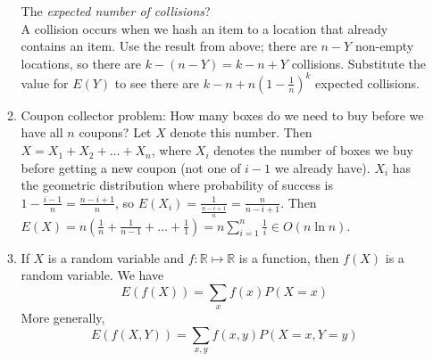 \documentclass[10pt]{article}
\begin{document}
\begin{multicols}{2}
\begin{enumerate}
\begin{enumerate}
            
            The \textit{expected number of collisions}?\\ 
            A collision occurs when we hash an item to a location that already contains an item. Use the result from above; there are $n - Y$ non-empty locations, so there are $k - (n - Y) = k-n+Y$ collisions. Substitute the value for $E(Y)$ to see there are $k-n+n \left(1 - \frac{1}{n}\right)^k$ expected collisions.
            
            \item Coupon collector problem: How many boxes do we need to buy before we have all $n$ coupons? Let $X$ denote this number. Then $X = X_1 + X_2 + \hdots + X_{n}$, where $X_i$ denotes the number of boxes we buy before getting a new coupon (not one of $i-1$ we already have). $X_i$ has the geometric distribution where probability of success is $1 - \frac{i-1}{n} = \frac{n-i+1}{n}$, so $E(X_i) = \frac{1}{\frac{n-i+1}{n}} = \frac{n}{n-i+1}$. Then $E(X)=n \left( \frac{1}{n} + \frac{1}{n-1} + \ldots + \frac{1}{1} \right) = n\sum_{i=1}^{n} \frac{1}{i} \in O(n\ln n)$.
            \item If $X$ is a random variable and $f: \mathbb{R} \mapsto \mathbb{R}$ is a function, then $f(X)$ is a random variable. We have $$E(f(X)) = \sum_x f(x)P(X = x)$$
            More generally, $$E(f(X,Y)) = \sum_{x,y} f(x,y)P(X=x,Y=y)$$
             
        \end{enumerate}
        

\end{enumerate}
\end{multicols}
\end{document}
